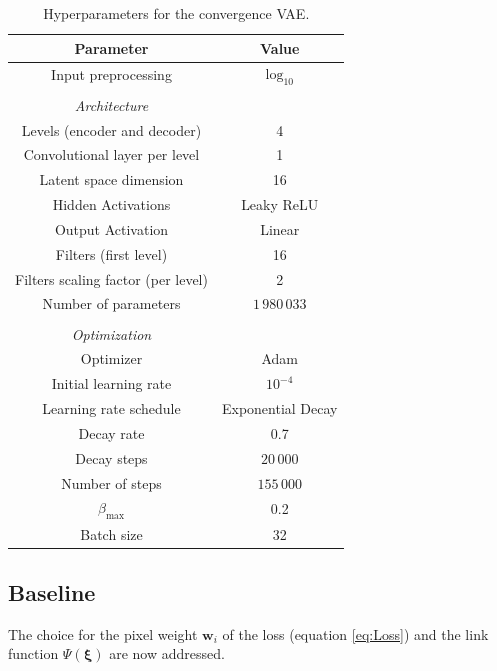 \documentclass[twocolumn]{aastex631}
\begin{document}
\begin{table}[H]
        \centering
        \caption{Hyperparameters for the convergence VAE.}
        \label{tab:Kappa VAE}
        \begin{tabular}{cc}
                Parameter & Value \\\hline\hline
                Input preprocessing & $\log_{10}$ \\
                              & \\

                \textit{Architecture} & \\
                Levels (encoder and decoder) & 4 \\
                Convolutional layer per level & 1 \\
                Latent space dimension & 16\\
                Hidden Activations & Leaky ReLU \\
                Output Activation & Linear \\
                Filters (first level) & 16 \\
                Filters scaling factor (per level) & 2 \\
                Number of parameters & $1\,980\,033$\\


                           & \\
                \textit{Optimization} & \\
                Optimizer & Adam\\
                Initial learning rate & $10^{-4}$ \\
                Learning rate schedule & Exponential Decay \\
                Decay rate & 0.7 \\
                Decay steps & $20\,000$ \\
                Number of steps & $155\,000$ \\
                $\beta_{\mathrm{max}}$ & 0.2 \\
                Batch size & 32\\
                \hline
        \end{tabular}

\end{table}



\subsection{Baseline}\label{sec:baseline training}
The choice for the pixel weight $\mathbf{w}_i$ of the loss (equation \eqref{eq:Loss})
and the link function $\Psi(\boldsymbol{\xi})$ are now addressed. 
\end{document}
